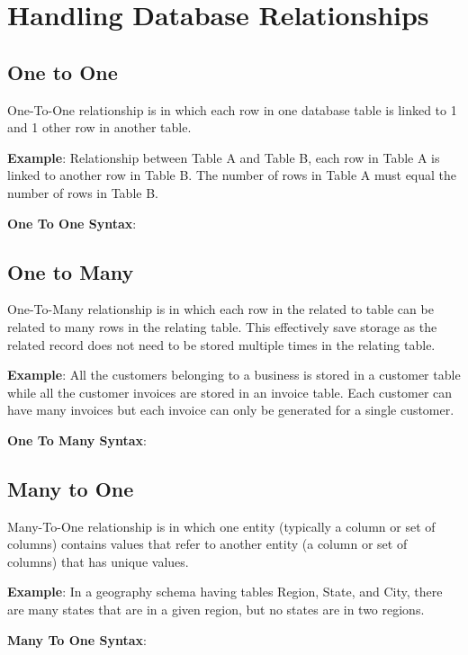 \section{Handling Database Relationships}

	\subsection{One to One}
	One-To-One relationship is in which each row in one database table is linked to 1 and 1 other row in another table.

	\textbf{Example}: Relationship between Table A and Table B, each row in Table A is linked to another row in Table B. The number of rows in Table A must equal the number of rows in Table B.

	\textbf{One To One Syntax}: 
		

	\subsection{One to Many}
	One-To-Many relationship is in which each row in the related to table can be related to many rows in the relating table. This effectively save storage as the related record does not need to be stored multiple times in the relating table.

	\textbf{Example}: All the customers belonging to a business is stored in a customer table while all the customer invoices are stored in an invoice table. Each customer can have many invoices but each invoice can only be generated for a single customer.	
			
	\textbf{One To Many Syntax}: 
		

	\subsection{Many to One}
	Many-To-One relationship is in which one entity (typically a column or set of columns) contains values that refer to another entity (a column or set of columns) that has unique values.

	\textbf{Example}: In a geography schema having tables Region, State, and City, there are many states that are in a given region, but no states are in two regions.
	
	\textbf{Many To One Syntax}: 
		

